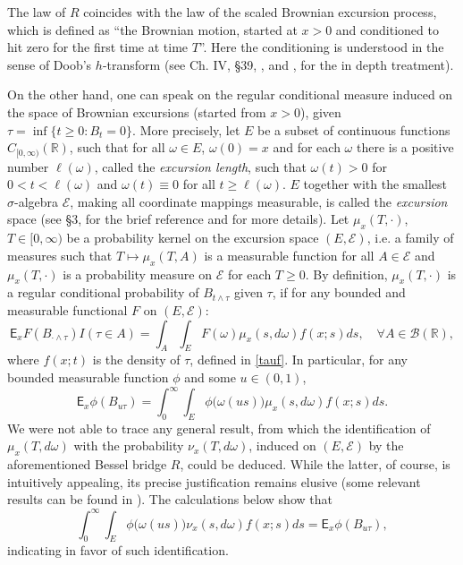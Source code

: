 \documentclass[reqno,10pt]{amsart}
\theoremstyle{definition}
\theoremstyle{remark}
\numberwithin{equation}{section}
\begin{document}
The law of $R$ coincides with the law of the scaled Brownian excursion process, which is defined
as ``the Brownian motion, started at $x>0$ and conditioned to hit zero for the
first time at time $T$''. Here the conditioning is understood in the sense of Doob's $h$-transform
(see Ch. IV, \S 39, \cite{RW}, and \cite{Bl92}, \cite{Do84} for the in depth treatment).

On the other hand, one can speak on the regular conditional measure induced on the space of Brownian excursions
(started from $x>0$), given $\tau=\inf\{t\ge 0: B_t=0\}$. More precisely,
let $E$ be a subset of continuous functions $C_{[0,\infty)}({\mathbb R})$, such that for all $\omega\in E$, $\omega(0)=x$
and for each $\omega$ there is a positive number $\ell(\omega)$, called the {\em excursion length},
such that $\omega(t)>0$ for $0<t< \ell(\omega)$ and  $\omega(t)\equiv 0$ for all $t\ge \ell(\omega)$. $E$ together with the smallest $\sigma$-algebra $\mathcal{E}$, making all
coordinate mappings measurable, is called the {\em excursion} space  (see \S 3, \cite{BoSa96} for the
brief reference and \cite{Bl92} for  more details). Let $\mu_x(T,\cdot)$, $T\in[0,\infty)$ be a probability kernel on the
excursion space $(E,\mathcal{E})$, i.e. a family of measures such that $T\mapsto \mu_x(T,A)$ is a measurable function for all $A\in \mathcal{E}$
and $\mu_x(T,\cdot)$ is a probability measure on $\mathcal{E}$ for each $T\ge 0$. By definition, $\mu_x(T,\cdot)$ is
a regular conditional probability of $B_{t\wedge \tau}$ given $\tau$, if for any bounded and measurable functional $F$
on $(E,\mathcal{E})$:
$$
{\mathsf{E}}_x F(B_{\cdot \wedge \tau})I(\tau\in A) = \int_A \int_E F(\omega) \mu_x(s,d\omega) f(x;s)ds,\quad \forall  A\in {\mathcal{B}}({\mathbb R}),
$$
where $f(x;t)$ is the density of $\tau$, defined in \eqref{tauf}. In particular, for any bounded measurable
function $\phi$ and some $u\in(0,1)$,
\begin{equation}
\label{mumu}
{\mathsf{E}}_x \phi(B_{u\tau}) = \int_0^\infty \int_E \phi\big(\omega(us)\big) \mu_x(s,d\omega) f(x;s)ds.
\end{equation}
We were not able to trace any general result, from which the identification  of $\mu_x(T,d\omega)$ with the probability
$\nu_x(T,d\omega)$, induced on $(E,\mathcal{E})$ by the aforementioned Bessel bridge $R$, could be deduced.
While the latter, of course, is intuitively appealing, its precise justification remains elusive
(some relevant results can be found in \cite{FPY93}). The calculations below show that
\begin{equation}
\label{nunu}
\int_0^\infty \int_E \phi\big(\omega(us)\big) \nu_x(s,d\omega) f(x;s)ds={\mathsf{E}}_x \phi(B_{u\tau}),
\end{equation}
indicating in favor of such identification.
\end{document}
